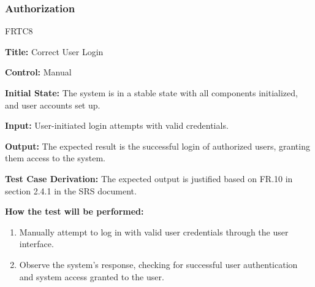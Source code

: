 \documentclass[12pt, titlepage]{article}
\begin{document}
\subsubsection{Authorization}
\hypertarget{Auth}{}
\begin{itemize}
    \begin{item}
        FRTC8
        \begin{mdframed}[linewidth=0.5mm]
            \textbf{Title:} Correct User Login \par
            \textbf{Control:} Manual \par
            \textbf{Initial State:} The system is in a stable state with all components initialized, and user accounts set up. \par
            \textbf{Input:} User-initiated login attempts with valid credentials. \par
            \textbf{Output:} The expected result is the successful login of authorized users, granting them access to the system. \par
            \textbf{Test Case Derivation:} The expected output is justified based on FR.10 in section 2.4.1 in the SRS document. \par
            \textbf{How the test will be performed:}
            \begin{enumerate}[noitemsep]
                \item Manually attempt to log in with valid user credentials through the user interface.
                \item Observe the system's response, checking for successful user authentication and system access granted to the user.
            \end{enumerate}
        \end{mdframed}
    \end{item}


\end{itemize}
\end{document}
